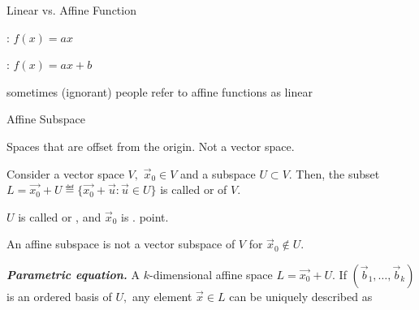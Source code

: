 \documentclass[handout,fleqn,aspectratio=169]{beamer}
\begin{document}
\begin{frame}{Linear vs. Affine Function}

\plitemsep 0.1in
{
\bci 
\item {}: $f(x) = ax$ 
\item {}: $f(x) = ax + b$ 
\item sometimes (ignorant) people refer to affine functions as linear
\eci
}
{
\centering
{}
}

\end{frame}

\begin{frame}{Affine Subspace}

\plitemsep 0.1in
\bci 
\item Spaces that are offset from the origin. Not a vector space.

\item {} Consider a vector space $V,$ $\vec{x}_0 \in V$ and a subspace $U \subset V.$ Then, the subset $L  = \vec{x_0} + U \eqdef \{\vec{x_0} + \vec{u} : \vec{u} \in U \}$ is called  or  of $V.$

\item $U$ is called  or , and $\vec{x}_0$ is . point.

\item An affine subspace is not a vector subspace of $V$ for $\vec{x}_0 \notin U.$

\item {\bf \em Parametric equation.} A $k$-dimensional affine space $L = \vec{x_0} + U.$ If $(\vec{b}_1, \ldots, \vec{b}_k)$ is an ordered basis of $U,$ any element $\vec{x} \in L$ can be uniquely described as

\eci

\end{frame}
\end{document}
